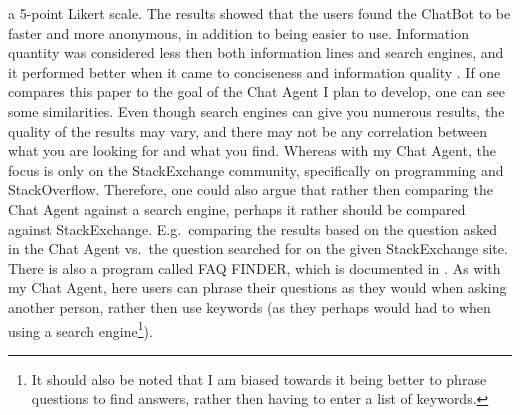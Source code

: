 a 5-point Likert scale. The results showed that the users found the ChatBot to be faster and more anonymous, in addition to being easier to use. Information quantity was 
considered less then both information lines and search engines, and it performed better when it came to conciseness and information quality \cite[p.~517-518]{Crutzen2011}.
\vspace{0.5em}\newline
If one compares this paper to the goal of the Chat Agent I plan to develop, one can see some similarities. Even though search engines can give you numerous results, the quality 
of the results may vary, and there may not be any correlation between what you are looking for and what you find. Whereas with my Chat Agent, the focus is only on the StackExchange 
community, specifically on programming and StackOverflow. Therefore, one could also argue that rather then comparing the Chat Agent against a search engine, perhaps it rather should 
be compared against StackExchange. E.g.~comparing the results based on the question asked in the Chat Agent vs.~the question searched for on the given StackExchange site.
\vspace{0.5em}\newline
There is also a program called FAQ FINDER, which is documented in \cite{Burke1997}. As with my Chat Agent, here users can phrase their questions as they would when asking another 
person, rather then use keywords (as they perhaps would had to when using a search engine\footnote{It should also be noted that I am biased towards it being better to phrase questions 
	to find answers, rather then having to enter a list of keywords.}). 

